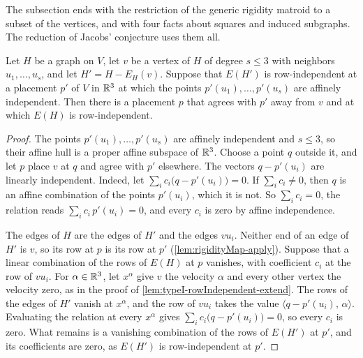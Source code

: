 The subsection ends with the restriction of the generic rigidity matroid
to a subset of the vertices, and with four facts about squares and
induced subgraphs. The reduction of Jacobs' conjecture uses them all.

\begin{lemma}
  \label{lem:zero-extension-rowIndependent}
  \leanok
  Let $H$ be a graph on $V$, let $v$ be a vertex of $H$ of degree
  $s \le 3$ with neighbors $u_1, \dots, u_s$, and let
  $H' = H - E_H(v)$. Suppose that $E(H')$ is row-independent at a
  placement $p'$ of $V$ in ${\mathbb{R}}^3$ at which the points
  $p'(u_1), \dots, p'(u_s)$ are affinely independent. Then there is a
  placement $p$ that agrees with $p'$ away from $v$ and at which $E(H)$
  is row-independent.
\end{lemma}
\begin{proof}
  \leanok
  The points $p'(u_1), \dots, p'(u_s)$ are affinely independent and
  $s \le 3$, so their affine hull is a proper affine subspace of ${\mathbb{R}}^3$.
  Choose a point $q$ outside it, and let $p$ place $v$ at $q$ and agree
  with $p'$ elsewhere. The vectors $q - p'(u_i)$ are linearly
  independent. Indeed, let $\sum_i c_i \bigl(q - p'(u_i)\bigr) = 0$. If
  $\sum_i c_i \ne 0$, then $q$ is an affine combination of the points
  $p'(u_i)$, which it is not. So $\sum_i c_i = 0$, the relation reads
  $\sum_i c_i\, p'(u_i) = 0$, and every $c_i$ is zero by affine
  independence.

  The edges of $H$ are the edges of $H'$ and the edges $vu_i$. Neither
  end of an edge of $H'$ is $v$, so its row at $p$ is its row at $p'$
  (\cref{lem:rigidityMap-apply}). Suppose that a linear combination of
  the rows of $E(H)$ at $p$ vanishes, with coefficient $c_i$ at the row
  of $vu_i$. For $\alpha \in {\mathbb{R}}^3$, let $x^{\alpha}$ give $v$ the
  velocity $\alpha$ and every other vertex the velocity zero, as in the
  proof of \cref{lem:typeI-rowIndependent-extend}. The rows of the edges
  of $H'$ vanish at $x^{\alpha}$, and the row of $vu_i$ takes the value
  $\langle q - p'(u_i),\, \alpha \rangle$. Evaluating the relation at
  every $x^{\alpha}$ gives $\sum_i c_i \bigl(q - p'(u_i)\bigr) = 0$, so
  every $c_i$ is zero. What remains is a vanishing combination of the
  rows of $E(H')$ at $p'$, and its coefficients are zero, as $E(H')$ is
  row-independent at $p'$.
\end{proof}

